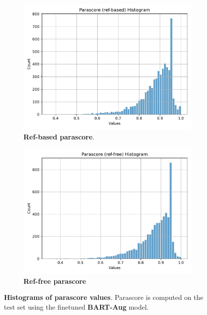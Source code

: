 \documentclass[fleqn,moreauthors,10pt]{ds_report}
\begin{document}
\begin{figure}[ht]
    \centering
    \begin{subfigure}{0.45\linewidth} %
        \centering
        \includegraphics[width=\textwidth]{bart-aug-parascore-ref-based-hist.pdf}
        \caption{\textbf{Ref-based parascore}.}
        \label{fig:bart-aug-parascore-ref-based-hist}
    \end{subfigure}
    \hfill %
    \begin{subfigure}{0.45\linewidth} %
        \centering
        \includegraphics[width=\textwidth]{bart-aug-parascore-ref-free-hist.pdf}
        \caption{\textbf{Ref-free parascore}}
        \label{fig:bart-aug-parascore-ref-free-hist}
    \end{subfigure}
    \caption{\textbf{Histograms of parascore values}. Parascore is computed on the test set using the finetuned \textbf{BART-Aug} model.}
    \label{fig:bart-aug-parascore-hist}
\end{figure}
\end{document}
